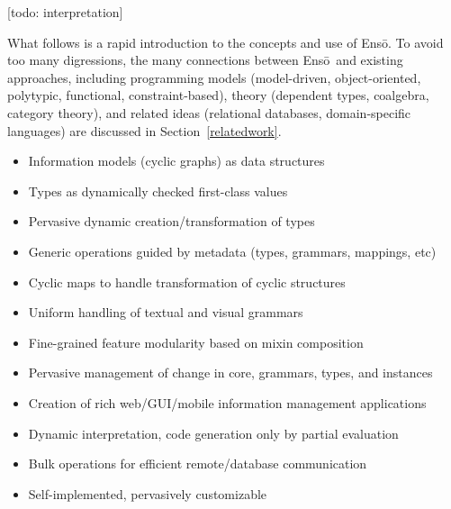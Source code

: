 \documentclass[11pt]{article}
\newcommand{\Enso}{Ens\={o}}
\begin{document}
[todo: interpretation]

What follows is a rapid introduction to the concepts and use of
\Enso. To avoid too many digressions, 
the many connections between \Enso\ and existing approaches,
including programming models
(model-driven, object-oriented, polytypic, functional, constraint-based), theory (dependent types, coalgebra, category theory),
and related ideas (relational databases, domain-specific languages)
are discussed in Section~\ref{relatedwork}.








\begin{itemize}
\item Information models (cyclic graphs) as data structures

\item Types as dynamically checked first-class values

\item Pervasive dynamic creation/transformation of types

\item Generic operations guided by metadata (types, grammars, mappings, etc)

\item Cyclic maps to handle transformation of cyclic structures

\item Uniform handling of textual and visual grammars

\item Fine-grained feature modularity based on mixin composition

\item Pervasive management of change in core, grammars, types, and instances

\item Creation of rich web/GUI/mobile information management applications

\item Dynamic interpretation, code generation only by partial evaluation

\item Bulk operations for efficient remote/database communication

\item Self-implemented, pervasively customizable
\end{itemize}
\end{document}

